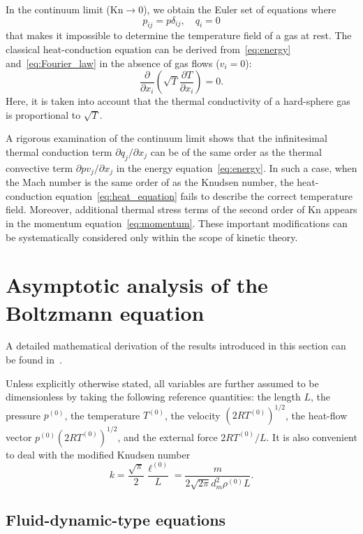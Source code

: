 \documentclass[smallextended, referee]{svjour3} %
\newcommand{\Kn}{\mathrm{Kn}}
\newcommand{\pder}[2][]{\frac{\partial#1}{\partial#2}}
\newcommand{\Pder}[2][]{\partial#1/\partial#2}
\begin{document}
In the continuum limit (\(\Kn\to0\)), we obtain the Euler set of equations where
\begin{equation}
    p_{ij} = p\delta_{ij}, \quad q_i = 0
\end{equation}
that makes it impossible to determine the temperature field of a gas at rest.
The classical heat-conduction equation
can be derived from~\eqref{eq:energy} and~\eqref{eq:Fourier_law}
in the absence of gas flows (\(v_i = 0\)):
\begin{equation}\label{eq:heat_equation}
    \pder{x_i}\left(\sqrt{T}\pder[T]{x_i}\right) = 0.
\end{equation}
Here, it is taken into account that the thermal conductivity of a hard-sphere gas
is proportional to \(\sqrt{T}\).

A rigorous examination of the continuum limit shows that the infinitesimal thermal conduction term \(\Pder[q_j]{x_j}\)
can be of the same order as the thermal convective term \(\Pder[pv_j]{x_j}\) in the energy equation~\eqref{eq:energy}.
In such a case, when the Mach number is the same order of as the Knudsen number,
the heat-conduction equation~\eqref{eq:heat_equation} fails to describe
the correct temperature field. Moreover, additional thermal stress terms of the second order of \(\Kn\)
appears in the momentum equation~\eqref{eq:momentum}.
These important modifications can be systematically considered only within the scope of kinetic theory.

\section{Asymptotic analysis of the Boltzmann equation}

A detailed mathematical derivation of the results introduced in this section
can be found in~\cite{Sone2002, Sone2007}.

Unless explicitly otherwise stated, all variables are further assumed to be dimensionless
by taking the following reference quantities:
the length \(L\), the pressure \(p^{(0)}\), the temperature \(T^{(0)}\),
the velocity \((2RT^{(0)})^{1/2}\), the heat-flow vector \(p^{(0)}(2RT^{(0)})^{1/2}\),
and the external force \(2RT^{(0)}/L\).
It is also convenient to deal with the modified Knudsen number
\[ k = \frac{\sqrt\pi}2\frac{\ell^{(0)}}{L} = \frac{m}{2\sqrt{2\pi} d_m^2 \rho^{(0)}L}. \]

\subsection{Fluid-dynamic-type equations}
\end{document}
